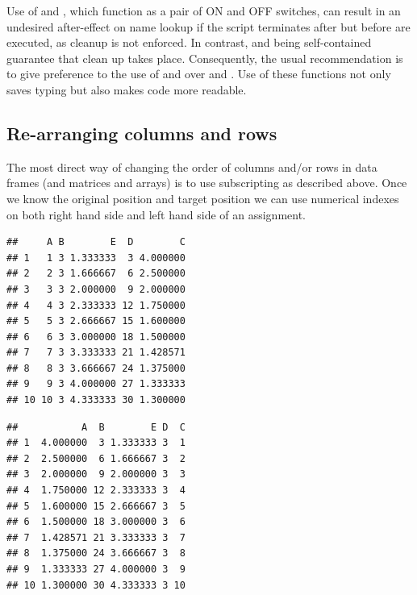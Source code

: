 \documentclass[krantz2]{krantz}\usepackage{knitr}%
\begin{document}
\begin{explainbox}
Use of  and , which function as a pair of ON and OFF switches, can result in an undesired after-effect on name lookup if the script terminates after  but before  are executed, as cleanup is not enforced. In contrast,  and  being self-contained guarantee that clean up takes place. Consequently, the usual recommendation is to give preference to the use of  and  over  and . Use of these functions not only saves typing but also makes code more readable.
\end{explainbox}

\subsection{Re-arranging columns and rows}
The most direct way of changing the order of columns and/or rows in data frames (and matrices and arrays) is to use subscripting as described above. Once we know the original position and target position we can use numerical indexes on both right hand side and left hand side of an assignment.

\begin{knitrout}\footnotesize
{}\color{fgcolor}\begin{kframe}
\begin{alltt}
\end{alltt}
\begin{verbatim}
##     A B        E  D        C
## 1   1 3 1.333333  3 4.000000
## 2   2 3 1.666667  6 2.500000
## 3   3 3 2.000000  9 2.000000
## 4   4 3 2.333333 12 1.750000
## 5   5 3 2.666667 15 1.600000
## 6   6 3 3.000000 18 1.500000
## 7   7 3 3.333333 21 1.428571
## 8   8 3 3.666667 24 1.375000
## 9   9 3 4.000000 27 1.333333
## 10 10 3 4.333333 30 1.300000
\end{verbatim}
\begin{alltt}
\hlstd{my_data_frame.df[ ,} \hlopt{:}\hlstd{]} \hlkwb{<-} \hlstd{my_data_frame.df[ ,} \hlopt{:}\hlstd{]}
\end{alltt}
\begin{verbatim}
##           A  B        E D  C
## 1  4.000000  3 1.333333 3  1
## 2  2.500000  6 1.666667 3  2
## 3  2.000000  9 2.000000 3  3
## 4  1.750000 12 2.333333 3  4
## 5  1.600000 15 2.666667 3  5
## 6  1.500000 18 3.000000 3  6
## 7  1.428571 21 3.333333 3  7
## 8  1.375000 24 3.666667 3  8
## 9  1.333333 27 4.000000 3  9
## 10 1.300000 30 4.333333 3 10
\end{verbatim}
\end{kframe}
\end{knitrout}
\end{document}
